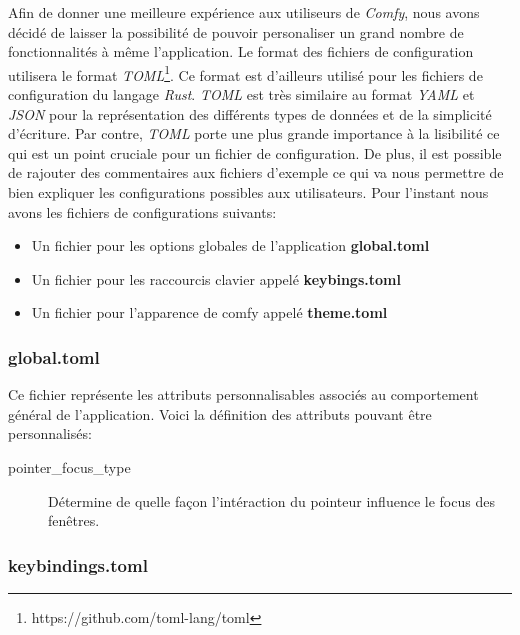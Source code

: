 \documentclass[titlepage]{article}
\begin{document}
\par
\bigskip
Afin de donner une meilleure expérience aux utiliseurs de \textit{Comfy}, nous
avons décidé de laisser la possibilité de pouvoir personaliser un grand nombre
de fonctionnalités à même l'application. Le format des fichiers de
configuration utilisera le format
\textit{TOML}\footnote{https://github.com/toml-lang/toml}. Ce format est
d'ailleurs utilisé pour les fichiers de configuration du langage \textit{Rust}.
\textit{TOML} est très similaire au format \textit{YAML} et \textit{JSON} pour la représentation des
différents types de données et de la simplicité d'écriture. Par contre,
\textit{TOML} porte une plus grande importance à la lisibilité ce qui est un
point cruciale pour un fichier de configuration. De plus, il est possible de
rajouter des commentaires aux fichiers d'exemple ce qui va nous permettre de
bien expliquer les configurations possibles aux utilisateurs. Pour l'instant
nous avons les fichiers de configurations suivants:
\begin{itemize}
	\item Un fichier pour les options globales de l'application \textbf{global.toml}
	\item Un fichier pour les raccourcis clavier appelé \textbf{keybings.toml}
	\item Un fichier pour l'apparence de comfy appelé \textbf{theme.toml}
\end{itemize}

\subsubsection{global.toml}
\begin{minipage}{\linewidth}
	
\end{minipage}

\par
Ce fichier représente les attributs personnalisables associés au comportement général de l'application. Voici la définition des attributs pouvant être personnalisés:
\begin{description}
	\item [pointer\_focus\_type] Détermine de quelle façon l'intéraction du pointeur influence le focus des fenêtres.
\end{description}

\subsubsection{keybindings.toml}
\begin{minipage}{\linewidth}
	
\end{minipage}
\end{document}

